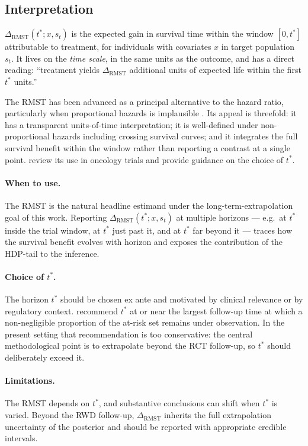 \documentclass[11pt]{article}
\theoremstyle{plain}
\theoremstyle{definition}
\theoremstyle{remark}
\newcommand{\1}{\mathds{1}}
\newcommand{\RMST}{\mathrm{RMST}}
\begin{document}
\subsection{Interpretation}

$\Delta_{\RMST}(t^{*}; x, s_{t})$ is the expected gain in survival time
within the window $[0, t^{*}]$ attributable to treatment, for individuals
with covariates $x$ in target population $s_{t}$. It lives on the
\emph{time scale}, in the same units as the outcome, and has a direct
reading: ``treatment yields $\Delta_{\RMST}$ additional units of expected
life within the first $t^{*}$ units.''

The RMST has been advanced as a principal alternative to the hazard ratio,
particularly when proportional hazards is implausible
\citep{Royston2011, Royston2013, Uno2014}. Its appeal is threefold: it has
a transparent units-of-time interpretation; it is well-defined under
non-proportional hazards including crossing survival curves; and it
integrates the full survival benefit within the window rather than
reporting a contrast at a single point. \citet{Uno2014} review its use in
oncology trials and provide guidance on the choice of $t^{*}$.

\paragraph{When to use.} The RMST is the natural headline estimand under
the long-term-extrapolation goal of this work. Reporting
$\Delta_{\RMST}(t^{*}; x, s_{t})$ at multiple horizons --- e.g.\ at
$t^{*}$ inside the trial window, at $t^{*}$ just past it, and at
$t^{*}$ far beyond it --- traces how the survival benefit evolves with
horizon and exposes the contribution of the HDP-tail to the inference.

\paragraph{Choice of $t^{*}$.} The horizon $t^{*}$ should be chosen
ex ante and motivated by clinical relevance or by regulatory context.
\citet{Royston2013} recommend $t^{*}$ at or near the largest follow-up
time at which a non-negligible proportion of the at-risk set remains
under observation. In the present setting that recommendation is too
conservative: the central methodological point is to extrapolate beyond
the RCT follow-up, so $t^{*}$ should deliberately exceed it.

\paragraph{Limitations.} The RMST depends on $t^{*}$, and substantive
conclusions can shift when $t^{*}$ is varied. Beyond the RWD follow-up,
$\Delta_{\RMST}$ inherits the full extrapolation uncertainty of the
posterior and should be reported with appropriate credible intervals.
\end{document}
